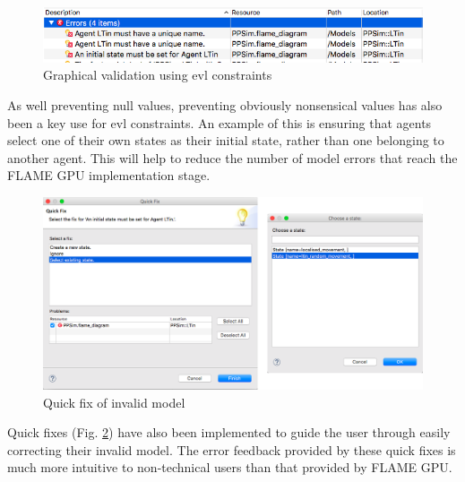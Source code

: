 \documentclass{UoYCSproject}
\begin{document}
\begin{figure}[htp]
\centering
\includegraphics[width=\textwidth]{Appendix/validation_gmf}
\caption{Graphical validation using \gls{evl} constraints}
\label{fig:validation_gmf}
\end{figure}

As well preventing null values, preventing obviously nonsensical values has also been a key use for \gls{evl} constraints.
An example of this is ensuring that agents select one of their own states as their initial state, rather than one belonging to another agent.
This will help to reduce the number of model errors that reach the \gls{FLAME GPU} implementation stage.


\begin{figure}[htp]
\centering
\includegraphics[width=\textwidth]{Appendix/validation_quickfix_gmf}
\caption{Quick fix of invalid model}
\label{fig:validation_quickfix_gmf}
\end{figure}

Quick fixes (Fig. \ref{fig:validation_quickfix_gmf}) have also been implemented to guide the user through easily correcting their invalid model.
The error feedback provided by these quick fixes is much more intuitive to non-technical users than that provided by \gls{FLAME GPU}.



\end{document}
